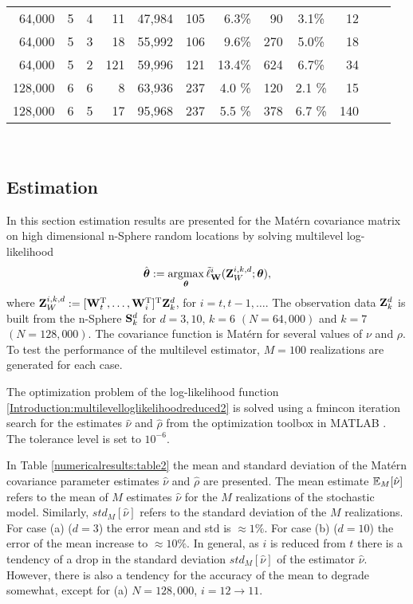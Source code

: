 \documentclass[11pt,final]{amsart}       %
\begin{document}
\begin{table*}[htpb]
\begin{center}
\begin{tabular}{ r r r r c c r r c r c r}
64,000 & 5 & 4 &  11  & 47,984 & 105 &  6.3\% &   90 & 3.1\%  & 12 \\
64,000 & 5 & 3 &  18  & 55,992 & 106 &  9.6\% &  270 & 5.0\%  & 18 \\
64,000 & 5 & 2 & 121  & 59,996 & 121 & 13.4\% & 624 & 6.7\%  & 34 \\
\hline
128,000 & 6 & 6 &  8  &  63,936 &  237 & 4.0 \% & 120  & 2.1 \% & 15 \\
128,000 & 6 & 5 & 17  &  95,968 &  237 & 5.5 \% & 378 & 6.7 \% & 140 \\
\end{tabular}
\vspace{5mm}
\\
\end{center}
\label{numericalresults:table1}
\end{table*}

\subsection{Estimation}

In this section estimation results are presented for the Mat\'{e}rn
covariance matrix on high dimensional n-Sphere random locations by
solving multilevel log-likelihood
\[
\hat{\btheta} : =
\argmax_{\btheta}
\tilde{\ell}^{i}_{\bW}(\bZ^{i,k,d}_{W};\btheta),
\]
where $\mathbf{Z}^{i,k,d}_{W} := [\mathbf{W}_t ^{\rm T}, \dots, \mathbf{W}_i ^{\rm T} ] ^{\rm T}
\mathbf{Z}^{d}_{k}$, for $i = t, t-1, \dots$. The observation data $\mathbf{Z}^d_k$
is built from the n-Sphere $\mathbf{S}^d_k$ for $d = 3,10$, $k = 6$ $(N =
64,000)$ and $k = 7$ $(N = 128,000)$. The covariance function is
Mat\'{e}rn for several values of $\nu$ and $\rho$. To test the
performance of the multilevel estimator, $M = 100$ realizations are
generated for each case.

The optimization problem of the log-likelihood function
\eqref{Introduction:multilevelloglikelihoodreduced2} is solved using
a fmincon iteration search for the estimates $\hat \nu$ and $\hat
\rho$ from the optimization toolbox in MATLAB \cite{Matlab2016}. The
tolerance level is set to $10^{-6}$.

In Table \ref{numericalresults:table2} the mean and standard deviation
of the Mat\'{e}rn covariance parameter estimates $\hat \nu$ and $\hat
\rho$ are presented. The mean estimate $\mathbb{E}_M [\hat{\nu}]$ refers to
the mean of $M$ estimates $\hat{\nu}$ for the $M$ realizations of the
stochastic model. Similarly, $std_M [\hat{\nu}]$ refers to the
standard deviation of the $M$ realizations. For case (a) ($d = 3$) the
error mean and std is $\approx 1\%$. For case (b) ($d = 10$) the error
of the mean increase to $\approx 10 \%$. In general, as $i$ is reduced
from $t$ there is a tendency of a drop in the standard deviation
$std_M [\hat{\nu}]$ of the estimator $\hat \nu$. However, there is
also a tendency for the accuracy of the mean to degrade somewhat,
except for (a) $N = 128,000$, $i = 12 \rightarrow 11$.
\end{document}
